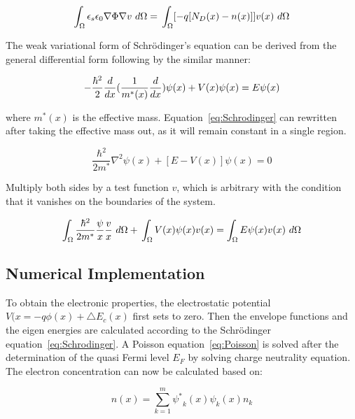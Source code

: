 \begin{equation}
  \int_\Omega\epsilon_s\epsilon_0\nabla\Phi\nabla{v}\ d\Omega = \\
  \int_{\Omega}[{-q[N_D(x)-n(x)]}]{v(x)}\ d\Omega
  \label{eq:Poisson_VFF}
\end{equation}

The weak variational form of Schr{\"o}dinger's equation can be derived from the general differential form following by the similar manner:

\begin{equation}
  -\frac{\hbar^2}{2}\frac{d}{dx}(\frac{1}{m^\ast(x)}\frac{d}{dx})\psi(x)+\\
  V(x)\psi(x)=E\psi(x)
  \label{eq:Schrodinger}
\end{equation}

where $m^\ast(x)$ is the effective mass. Equation~\ref{eq:Schrodinger} can
rewritten after taking the effective mass out, as it will remain constant in a
single region.

\begin{equation}
  \frac{\hbar^2}{2{m^\ast}}\nabla^2\psi(x)+[E-V(x)]\psi(x) = 0
  \label{eq:Schrodinger_VF}
\end{equation}

Multiply both sides by a test function $v$, which is arbitrary with the condition that it vanishes on the boundaries of the system.

\begin{equation}
  \int_\Omega\frac{\hbar^2}{2{m^\ast}}\frac{\psi}{x}\frac{v}{x}\ d\Omega +\\
  \int_{\Omega}V(x)\psi(x)v(x) = \int_{\Omega}E\psi(x)v(x)\ d\Omega 
  \label{eq:Schrodinger_VFF}
\end{equation}

\subsection{Numerical Implementation}\label{sec:NI}

To obtain the electronic properties, the electrostatic potential
$V(x=-q\phi(x)+{\triangle}{E_c}(x)$ first sets to zero. Then the envelope
functions and the eigen energies are calculated according to the Schr{\"o}dinger
equation~\ref{eq:Schrodinger}. A Poisson equation~\ref{eq:Poisson} is solved
after the determination of the quasi Fermi level $E_F$ by solving charge
neutrality equation. The electron concentration can now be calculated based on:

\begin{equation}
  n(x) = {\sum\limits_{k=1}^{m}}{\psi^\ast}_k(x){\psi_k}(x){n_k}
  \label{eq:EC}
\end{equation}

